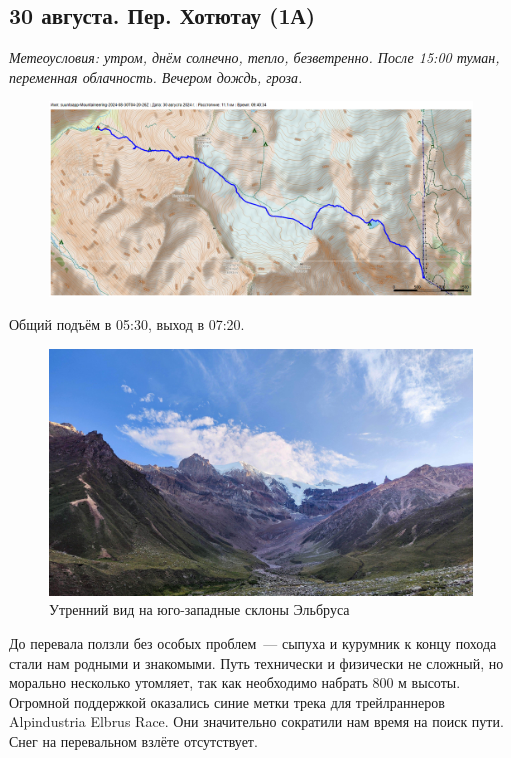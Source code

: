 \subsection{30 августа. Пер. Хотютау (1А)}
\textit{Метеоусловия: утром, днём солнечно, тепло, безветренно. После 15:00 туман, переменная облачность. Вечером дождь, гроза.}

\begin{figure}[h!]
	\centering
	\includegraphics[angle=0, width=0.7\linewidth]{../pics/mini_maps/30}
	\label{fig:mini_30}
\end{figure}

Общий подъём в 05:30, выход в 07:20.

\begin{figure}[h!]
	\centering
	\includegraphics[width=0.7\linewidth]{../pics/IMG_20240830_063548}
	\caption{Утренний вид на юго-западные склоны Эльбруса}
	\label{fig:IMG_20240830_063548}
\end{figure}

До перевала ползли без особых проблем~--- сыпуха и курумник к концу похода стали нам родными и знакомыми. Путь технически и физически не сложный, но морально несколько утомляет, так как необходимо набрать 800 м высоты. Огромной поддержкой оказались синие метки трека для трейлраннеров Alpindustria Elbrus Race. Они значительно сократили нам время на поиск пути. Снег на перевальном взлёте отсутствует.

